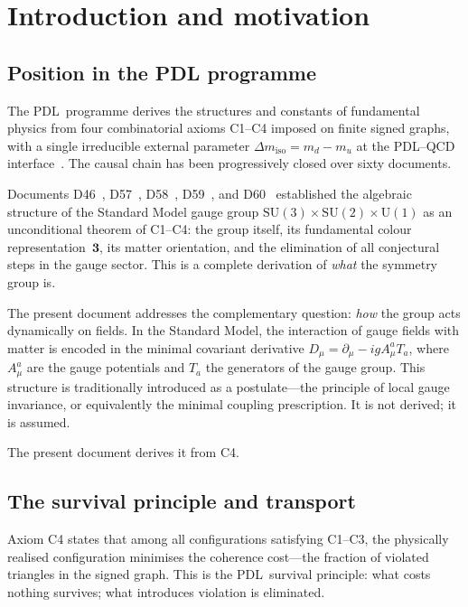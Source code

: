 \documentclass[11pt,a4paper]{article}
\theoremstyle{plain}
\theoremstyle{definition}
\theoremstyle{remark}
\newcommand{\PDL}{\textsc{PDL}}
\newcommand{\Uone}{\mathrm{U}(1)}
\newcommand{\SUtwo}{\mathrm{SU}(2)}
\newcommand{\SUthree}{\mathrm{SU}(3)}
\newcommand{\Dmu}{D_\mu}
\begin{document}
\section{Introduction and motivation}
\label{sec:intro}

\subsection{Position in the PDL programme}

The \PDL\ programme derives the structures and constants of fundamental physics
from four combinatorial axioms C1--C4 imposed on finite signed graphs, with a
single irreducible external parameter $\Delta m_{\mathrm{iso}} = m_d - m_u$ at the
PDL--QCD interface~\cite{DM_v27}. The causal chain has been progressively closed
over sixty documents.

Documents D46~\cite{PDL_D46}, D57~\cite{PDL_D57}, D58~\cite{PDL_D58},
D59~\cite{PDL_D59}, and D60~\cite{PDL_D60} established the algebraic structure of
the Standard Model gauge group $\SUthree \times \SUtwo \times \Uone$ as an
unconditional theorem of C1--C4: the group itself, its fundamental colour
representation~$\mathbf{3}$, its matter orientation, and the elimination of all
conjectural steps in the gauge sector. This is a complete derivation of
\emph{what} the symmetry group is.

The present document addresses the complementary question: \emph{how} the group
acts dynamically on fields. In the Standard Model, the interaction of gauge fields
with matter is encoded in the minimal covariant derivative
$\Dmu = \partial_\mu - igA_\mu^a T_a$, where $A_\mu^a$ are the gauge potentials
and $T_a$ the generators of the gauge group. This structure is traditionally
introduced as a postulate---the principle of local gauge invariance, or equivalently
the minimal coupling prescription. It is not derived; it is assumed.

The present document derives it from C4.

\subsection{The survival principle and transport}

Axiom C4 states that among all configurations satisfying C1--C3, the physically
realised configuration minimises the coherence cost---the fraction of violated
triangles in the signed graph. This is the \PDL\ survival principle: what costs
nothing survives; what introduces violation is eliminated.
\end{document}
